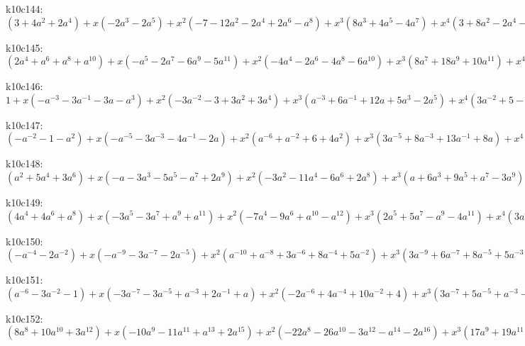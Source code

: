 k10c144: $ (3+4a^{2}+2a^{4}) +x(-2a^{3}-2a^{5}) +x^{2}(-7-12a^{2}-2a^{4}+2a^{6}-a^{8}) +x^{3}(8a^{3}+4a^{5}-4a^{7}) +x^{4}(3+8a^{2}-2a^{4}-6a^{6}+a^{8}) +x^{5}(-a-8a^{3}-4a^{5}+3a^{7}) +x^{6}(-2a^{2}+2a^{4}+4a^{6}) +x^{7}(a+4a^{3}+3a^{5}) +x^{8}(a^{2}+a^{4}) $

k10c145: $ (2a^{4}+a^{6}+a^{8}+a^{10}) +x(-a^{5}-2a^{7}-6a^{9}-5a^{11}) +x^{2}(-4a^{4}-2a^{6}-4a^{8}-6a^{10}) +x^{3}(8a^{7}+18a^{9}+10a^{11}) +x^{4}(a^{4}+9a^{8}+10a^{10}) +x^{5}(-6a^{7}-12a^{9}-6a^{11}) +x^{6}(-6a^{8}-6a^{10}) +x^{7}(a^{7}+2a^{9}+a^{11}) +x^{8}(a^{8}+a^{10}) $

k10c146: $ 1 +x(-a^{-3}-3a^{-1}-3a-a^{3}) +x^{2}(-3a^{-2}-3+3a^{2}+3a^{4}) +x^{3}(a^{-3}+6a^{-1}+12a+5a^{3}-2a^{5}) +x^{4}(3a^{-2}+5-6a^{2}-8a^{4}) +x^{5}(-2a^{-1}-11a-8a^{3}+a^{5}) +x^{6}(-2+a^{2}+3a^{4}) +x^{7}(a^{-1}+4a+3a^{3}) +x^{8}(1+a^{2}) $

k10c147: $ (-a^{-2}-1-a^{2}) +x(-a^{-5}-3a^{-3}-4a^{-1}-2a) +x^{2}(a^{-6}+a^{-2}+6+4a^{2}) +x^{3}(3a^{-5}+8a^{-3}+13a^{-1}+8a) +x^{4}(-2a^{-2}-6-4a^{2}) +x^{5}(-6a^{-3}-14a^{-1}-8a) +x^{6}(a^{-4}-a^{-2}-1+a^{2}) +x^{7}(2a^{-3}+4a^{-1}+2a) +x^{8}(a^{-2}+1) $

k10c148: $ (a^{2}+5a^{4}+3a^{6}) +x(-a-3a^{3}-5a^{5}-a^{7}+2a^{9}) +x^{2}(-3a^{2}-11a^{4}-6a^{6}+2a^{8}) +x^{3}(a+6a^{3}+9a^{5}+a^{7}-3a^{9}) +x^{4}(3a^{2}+10a^{4}+2a^{6}-5a^{8}) +x^{5}(-2a^{3}-7a^{5}-4a^{7}+a^{9}) +x^{6}(-3a^{4}-a^{6}+2a^{8}) +x^{7}(a^{3}+3a^{5}+2a^{7}) +x^{8}(a^{4}+a^{6}) $

k10c149: $ (4a^{4}+4a^{6}+a^{8}) +x(-3a^{5}-3a^{7}+a^{9}+a^{11}) +x^{2}(-7a^{4}-9a^{6}+a^{10}-a^{12}) +x^{3}(2a^{5}+5a^{7}-a^{9}-4a^{11}) +x^{4}(3a^{4}+5a^{6}-4a^{8}-5a^{10}+a^{12}) +x^{5}(-a^{5}-6a^{7}-2a^{9}+3a^{11}) +x^{6}(-a^{6}+3a^{8}+4a^{10}) +x^{7}(a^{5}+4a^{7}+3a^{9}) +x^{8}(a^{6}+a^{8}) $

k10c150: $ (-a^{-4}-2a^{-2}) +x(-a^{-9}-3a^{-7}-2a^{-5}) +x^{2}(a^{-10}+a^{-8}+3a^{-6}+8a^{-4}+5a^{-2}) +x^{3}(3a^{-9}+6a^{-7}+8a^{-5}+5a^{-3}) +x^{4}(-5a^{-6}-9a^{-4}-4a^{-2}) +x^{5}(-5a^{-7}-12a^{-5}-7a^{-3}) +x^{6}(a^{-8}+a^{-2}) +x^{7}(2a^{-7}+4a^{-5}+2a^{-3}) +x^{8}(a^{-6}+a^{-4}) $

k10c151: $ (a^{-6}-3a^{-2}-1) +x(-3a^{-7}-3a^{-5}+a^{-3}+2a^{-1}+a) +x^{2}(-2a^{-6}+4a^{-4}+10a^{-2}+4) +x^{3}(3a^{-7}+5a^{-5}+a^{-3}-3a^{-1}-2a) +x^{4}(2a^{-6}-6a^{-4}-15a^{-2}-7) +x^{5}(-2a^{-5}-7a^{-3}-4a^{-1}+a) +x^{6}(a^{-6}+3a^{-4}+5a^{-2}+3) +x^{7}(2a^{-5}+5a^{-3}+3a^{-1}) +x^{8}(a^{-4}+a^{-2}) $

k10c152: $ (8a^{8}+10a^{10}+3a^{12}) +x(-10a^{9}-11a^{11}+a^{13}+2a^{15}) +x^{2}(-22a^{8}-26a^{10}-3a^{12}-a^{14}-2a^{16}) +x^{3}(17a^{9}+19a^{11}-3a^{13}-5a^{15}) +x^{4}(21a^{8}+25a^{10}+2a^{12}-a^{14}+a^{16}) +x^{5}(-8a^{9}-8a^{11}+2a^{13}+2a^{15}) +x^{6}(-8a^{8}-9a^{10}+a^{14}) +x^{7}(a^{9}+a^{11}) +x^{8}(a^{8}+a^{10}) $

